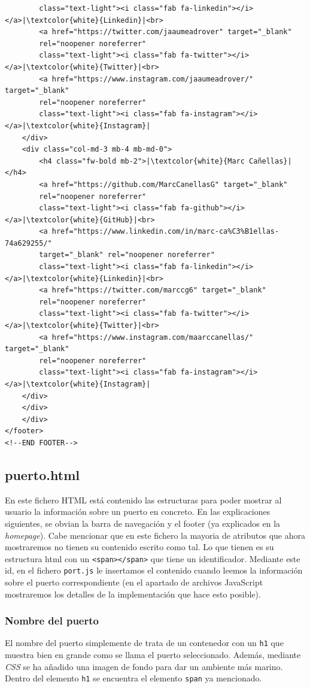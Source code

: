 \documentclass{article}
\begin{document}
\begin{verbatim}
        class="text-light"><i class="fab fa-linkedin"></i></a>|\textcolor{white}{Linkedin}|<br>
        <a href="https://twitter.com/jaaumeadrover" target="_blank"
        rel="noopener noreferrer"
        class="text-light"><i class="fab fa-twitter"></i></a>|\textcolor{white}{Twitter}|<br>
        <a href="https://www.instagram.com/jaaumeadrover/" target="_blank"
        rel="noopener noreferrer"
        class="text-light"><i class="fab fa-instagram"></i></a>|\textcolor{white}{Instagram}|
    </div>
    <div class="col-md-3 mb-4 mb-md-0">
        <h4 class="fw-bold mb-2">|\textcolor{white}{Marc Cañellas}|</h4>
        <a href="https://github.com/MarcCanellasG" target="_blank" 
        rel="noopener noreferrer"
        class="text-light"><i class="fab fa-github"></i></a>|\textcolor{white}{GitHub}|<br>
        <a href="https://www.linkedin.com/in/marc-ca%C3%B1ellas-74a629255/" 
        target="_blank" rel="noopener noreferrer"
        class="text-light"><i class="fab fa-linkedin"></i></a>|\textcolor{white}{Linkedin}|<br>
        <a href="https://twitter.com/marccg6" target="_blank" 
        rel="noopener noreferrer"
        class="text-light"><i class="fab fa-twitter"></i></a>|\textcolor{white}{Twitter}|<br>
        <a href="https://www.instagram.com/maarccanellas/" target="_blank"
        rel="noopener noreferrer"
        class="text-light"><i class="fab fa-instagram"></i></a>|\textcolor{white}{Instagram}|
    </div>
    </div>
    </div>
</footer>
<!--END FOOTER-->
\end{verbatim}

\subsection{puerto.html}
En este fichero HTML está contenido las estructuras para poder mostrar al usuario la información sobre un puerto en concreto. En las explicaciones siguientes, se obvian la barra de navegación y el footer (ya explicados en la \textit{homepage}). Cabe mencionar que en este fichero la mayoria de atributos que ahora mostraremos no tienen su contenido escrito como tal. Lo que tienen es su estructura html con un \texttt{<span></span>} que tiene un identificador. Mediante este id, en el fichero \texttt{port.js} le insertamos el contenido cuando leemos la información sobre el puerto correspondiente (en el apartado de archivos JavaScript mostraremos los detalles de la implementación que hace esto posible).

\subsubsection{Nombre del puerto}
El nombre del puerto simplemente de trata de un contenedor con un \texttt{h1} que muestra bien en grande como se llama el puerto seleccionado. Además, mediante \textit{CSS} se ha añadido una imagen de fondo para dar un ambiente más marino. Dentro del elemento \texttt{h1} se encuentra el elemento \texttt{span} ya mencionado.\\
\end{document}
